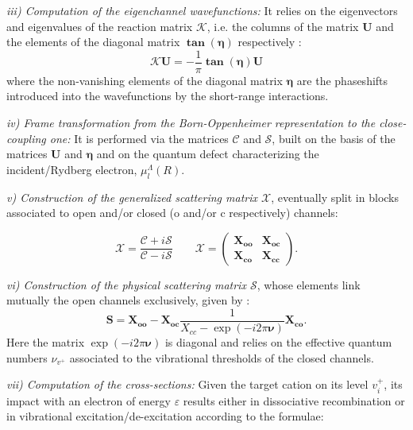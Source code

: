 \documentclass[reviewcopy]{elsarticle}
\begin{document}
\textit{iii) Computation of the eigenchannel wavefunctions:} It relies on the eigenvectors  and eigenvalues of the reaction matrix $\boldsymbol{\mathcal{K}}$, i.e. the columns of the matrix $\boldsymbol{{U}}$ and the elements of the diagonal matrix $\boldsymbol{\tan(\eta)}$ respectively : 
\begin{equation}
\boldsymbol{\mathcal{K}U}= -\frac{1}{\pi}\boldsymbol{\tan(\eta)U}
\end{equation}
\noindent
where the non-vanishing elements of the diagonal matrix $\boldsymbol\eta$ are the phaseshifts introduced into the wavefunctions by the short-range interactions.

\textit{iv) Frame transformation from the Born-Oppenheimer representation to the close-coupling one:} It is performed via the matrices 
$\boldsymbol{\mathcal{C}}$ and $\boldsymbol{\mathcal{S}}$, 
built on the basis of the matrices $\boldsymbol{{U}}$ and $\boldsymbol\eta$ and on the  quantum defect characterizing the incident/Rydberg electron, $\mu_{l}^{\Lambda}(R)$.

\textit{v) Construction of the generalized scattering 
matrix $\boldsymbol{\mathcal{X}}$}, eventually split in blocks associated to open and/or closed (o and/or c respectively) channels:

\begin{equation}
\boldsymbol{\mathcal{X}}=\frac{\boldsymbol{\mathcal{C}}+i\boldsymbol{\mathcal{S}}}{\boldsymbol{\mathcal{C}}-i\boldsymbol{\mathcal{S}}}
\qquad
\boldsymbol{\mathcal{X}}= \left(\begin{array}{cc} \boldsymbol{X_{oo}} & \boldsymbol{X_{oc}}\\
                   \boldsymbol{X_{co}} & \boldsymbol{X_{cc}} \end{array} \right).
\end{equation}

\textit{vi) Construction of the physical scattering matrix $\boldsymbol{\mathcal{S}}$}, whose elements link mutually the open channels exclusively, given by
\cite{Seaton1983}:
\begin{equation}\label{eq:solve3}
\boldsymbol{S}=\boldsymbol{X_{oo}}-\boldsymbol{X_{oc}}\frac{1}{X_{cc}-\exp(-i2\pi\boldsymbol{ \nu})}\boldsymbol{X_{co}}.
\end{equation}
\noindent
Here the matrix $\exp(-i2\pi\boldsymbol{ \nu})$ is diagonal and relies on the effective quantum numbers $\nu_{v^{+}}$ associated to the vibrational thresholds of the closed channels.

\textit{vii) Computation of the cross-sections:}
Given the target cation on its level $v_i^+$, its impact with an electron of energy $\varepsilon$ results either in dissociative recombination or in vibrational excitation/de-excitation according to the formulae:
\end{document}
